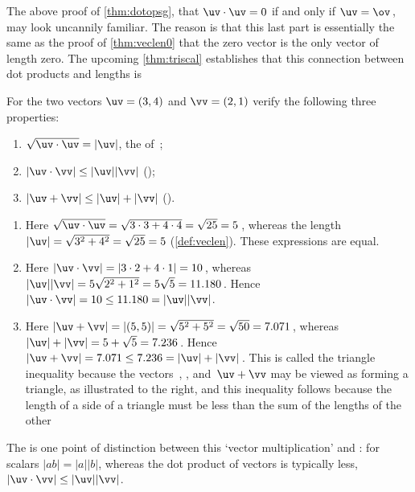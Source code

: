 The above proof of \cref{thm:dotopsg}, that \(\uv\cdot\uv=0\) if and only if \(\uv=\ov\)\,, may look uncannily familiar.
The reason is that this last part is essentially the same as the proof of \cref{thm:veclen0} that the zero vector is the only vector of length zero.
The upcoming \cref{thm:triscal} establishes that this connection between dot products and lengths is 




\begin{example} \label{eg:triscal}
For the two vectors \(\uv=(3,4)\) and \(\vv=(2,1)\) verify the following three properties: 
\begin{enumerate}
\item \(\sqrt{\uv\cdot\uv}=|\uv|\), the  of~\uv;
\item \(|\uv\cdot\vv|\leq|\uv||\vv|\) ();
\item \(|\uv+\vv|\leq|\uv|+|\vv|\) ().
\end{enumerate}

\begin{solution} 
\begin{enumerate}
\item Here \(\sqrt{\uv\cdot\uv}=\sqrt{3\cdot3+4\cdot4}=\sqrt{25}=5\)\,, whereas the length \(|\uv|=\sqrt{3^2+4^2}=\sqrt{25}=5\) (\cref{def:veclen}). These expressions are equal.

\item Here \(|\uv\cdot\vv|=|3\cdot2+4\cdot1|=10\)\,, whereas  \(|\uv||\vv|=5\sqrt{2^2+1^2}=5\sqrt5=11.180\)\,.  
Hence \(|\uv\cdot\vv|=10\leq11.180=|\uv||\vv|\).

\item 
\begin{figbox}{}%
Here \(|\uv+\vv|=|(5,5)|=\sqrt{5^2+5^2}=\sqrt{50}=7.071\)\,, whereas \(|\uv|+|\vv|=5+\sqrt5=7.236\)\,.
Hence \(|\uv+\vv|=7.071\leq7.236=|\uv|+|\vv|\)\,.
This is called the triangle inequality because the vectors~\uv, \vv, and~\(\uv+\vv\) may be viewed as forming a triangle, as illustrated to the right, and this inequality follows because the length of a side  of a triangle must be less than the sum of the lengths of the other 
\end{figbox}
\end{enumerate}
\end{solution}
\end{example}


The  is one point of distinction between this `vector multiplication' and : for scalars \(|ab|=|a||b|\), whereas the dot product of vectors is typically less, \(|\uv\cdot\vv|\leq|\uv||\vv|\).

